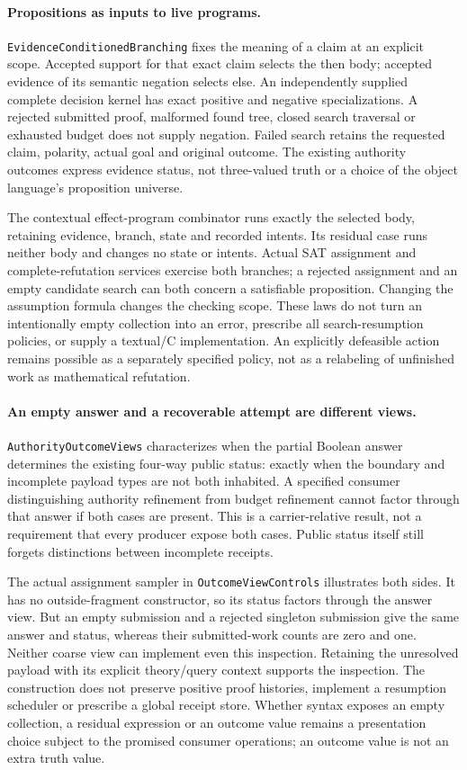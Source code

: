 \documentclass[11pt]{article}
\theoremstyle{definition}
\theoremstyle{remark}
\begin{document}
\paragraph{Propositions as inputs to live programs.}
\nolinkurl{EvidenceConditionedBranching} fixes the meaning of a claim at an
explicit scope. Accepted support for that exact claim selects the then body;
accepted evidence of its semantic negation selects else. An independently
supplied complete decision kernel has exact positive and negative
specializations. A rejected submitted proof, malformed found tree, closed
search traversal or exhausted budget does not supply negation. Failed search
retains the requested claim, polarity, actual goal and original outcome.
The existing authority outcomes express evidence status, not three-valued
truth or a choice of the object language's proposition universe.

The contextual effect-program combinator runs exactly the selected body,
retaining evidence, branch, state and recorded intents. Its residual case
runs neither body and changes no state or intents. Actual SAT assignment and
complete-refutation services exercise both branches; a rejected assignment
and an empty candidate search can both concern a satisfiable proposition.
Changing the assumption formula changes the checking scope. These laws do
not turn an intentionally empty collection into an error, prescribe all
search-resumption policies, or supply a textual/C implementation. An
explicitly defeasible action remains possible as a separately specified
policy, not as a relabeling of unfinished work as mathematical refutation.

\paragraph{An empty answer and a recoverable attempt are different views.}
\nolinkurl{AuthorityOutcomeViews} characterizes when the partial Boolean
answer determines the existing four-way public status: exactly when the
boundary and incomplete payload types are not both inhabited. A specified
consumer distinguishing authority refinement from budget refinement cannot
factor through that answer if both cases are present. This is a
carrier-relative result, not a requirement that every producer expose both
cases. Public status itself still forgets distinctions between incomplete
receipts.

The actual assignment sampler in \nolinkurl{OutcomeViewControls}
illustrates both sides. It has no outside-fragment constructor, so its
status factors through the answer view. But an empty submission and a
rejected singleton submission give the same answer and status, whereas
their submitted-work counts are zero and one. Neither coarse view can
implement even this inspection. Retaining the unresolved payload with its
explicit theory/query context supports the inspection. The construction
does not preserve positive proof histories, implement a resumption
scheduler or prescribe a global receipt store. Whether syntax exposes an
empty collection, a residual expression or an outcome value remains a
presentation choice subject to the promised consumer operations; an
outcome value is not an extra truth value.
\end{document}
